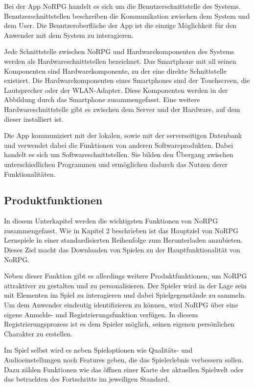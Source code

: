 		Bei der App NoRPG handelt es sich um die Benutzerschnittstelle des Systems. Benutzerschnittstellen beschreiben die Kommunikation zwischen dem System und dem User. Die Benutzeroberfläche der App ist die einzige Möglichkeit für den Anwender mit dem System zu interagieren.
		
		Jede Schnittstelle zwischen NoRPG und Hardwarekomponenten des Systems werden als Hardwareschnittstellen bezeichnet. Das Smartphone mit all seinen Komponenten sind Hardwarekomponente, zu der eine direkte  Schnittstelle existiert. Die Hardwarekomponenten eines Smartphones sind der Touchscreen, die Lautsprecher oder der WLAN-Adapter. Diese Komponenten werden in der Abbildung durch das Smartphone zusammengefasst. Eine weitere Hardwareschnittstelle gibt es zwischen dem Server und der Hardware, auf dem dieser installiert ist.
		
		Die App kommuniziert mit der lokalen, sowie mit der serverseitigen Datenbank und verwendet dabei die Funktionen von anderen Softwareprodukten. Dabei handelt es sich um Softwareschnittstellen. Sie bilden den Übergang zwischen unterschiedlichen Programmen und ermöglichen dadurch das Nutzen derer Funktionalitäten. 

	\subsection{Produktfunktionen}
		In diesem Unterkapitel werden die wichtigsten Funktionen von NoRPG zusammengefasst. Wie in Kapitel 2 beschrieben ist das Hauptziel von NoRPG Lernspiele in einer standardisierten Reihenfolge zum Herunterladen anzubieten. Dieses Ziel macht das Downloaden von Spielen zu der Hauptfunktionalität von NoRPG. 
		
		Neben dieser Funktion gibt es allerdings weitere Produktfunktionen, um NoRPG attraktiver zu gestalten und zu personalisieren. Der Spieler wird in der Lage sein mit Elementen im Spiel zu interagieren und dabei Spielgegenstände zu sammeln. Um dem Anwender eindeutig identifizieren zu können, wird NoRPG über eine eigene Anmelde- und Registrierungsfunktion verfügen. In diesem Registrierungsprozess ist es dem Spieler möglich, seinen eigenen persönlichen Charakter zu erstellen.
		
		Im Spiel selbst wird es neben Spieloptionen wie Qualitäts- und Audioeinstellungen noch Features geben, die das Spielerlebnis verbessern sollen. Dazu zählen Funktionen wie das öffnen einer Karte der aktuellen Spielwelt oder das betrachten des Fortschritts im jeweiligen Standard.
		
